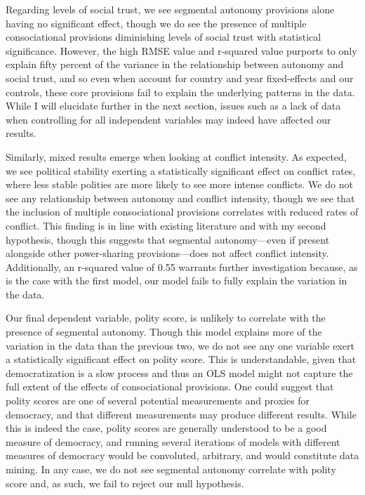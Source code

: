 \documentclass[12pt]{article}
\begin{document}
Regarding levels of social trust, we see segmental autonomy provisions alone having no significant effect, though we do see the presence of multiple consociational provisions diminishing levels of social trust with statistical significance. However, the high RMSE value and r-squared value purports to only explain fifty percent of the variance in the relationship between autonomy and social trust, and so even when account for country and year fixed-effects and our controls, these core provisions fail to explain the underlying patterns in the data. While I will elucidate further in the next section, issues such as a lack of data when controlling for all independent variables may indeed have affected our results. 

Similarly, mixed results emerge when looking at conflict intensity. As expected, we see political stability exerting a statistically significant effect on conflict rates, where less stable polities are more likely to see more intense conflicts. We do not see any relationship between autonomy and conflict intensity, though we see that the inclusion of multiple consociational provisions correlates with reduced rates of conflict. This finding is in line with existing literature and with my second hypothesis, though this suggests that segmental autonomy—even if present alongside other power-sharing provisions—does not affect conflict intensity. Additionally, an r-squared value of 0.55 warrants further investigation because, as is the case with the first model, our model fails to fully explain the variation in the data. 

Our final dependent variable, polity score, is unlikely to correlate with the presence of segmental autonomy. Though this model explains more of the variation in the data than the previous two, we do not see any one variable exert a statistically significant effect on polity score. This is understandable, given that democratization is a slow process and thus an OLS model might not capture the full extent of the effects of consociational provisions. One could suggest that polity scores are one of several potential measurements and proxies for democracy, and that different measurements may produce different results. While this is indeed the case, polity scores are generally understood to be a good measure of democracy, and running several iterations of models with different measures of democracy would be convoluted, arbitrary, and would constitute data mining. In any case, we do not see segmental autonomy correlate with polity score and, as such, we fail to reject our null hypothesis.
 
\end{document}
